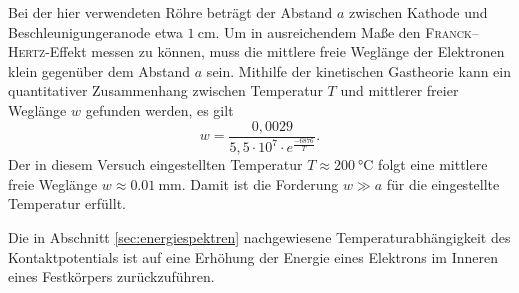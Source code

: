 Bei der hier verwendeten Röhre beträgt der Abstand $a$ zwischen Kathode und Beschleunigungeranode etwa $\SI{1}{\centi\meter}$\cite{skript}.
Um in ausreichendem Maße den \textsc{Franck}--\textsc{Hertz}-Effekt messen zu können, muss die mittlere freie Weglänge der Elektronen klein gegenüber dem Abstand $a$
sein.
Mithilfe der kinetischen Gastheorie kann ein quantitativer Zusammenhang zwischen Temperatur $T$ und mittlerer freier Weglänge $w$ gefunden werden, es gilt
\begin{equation}
	w=\frac{0,0029}{5,5\cdot10^7\cdot e^{\frac{-6876}{T}}}.
\end{equation}
Der in diesem Versuch eingestellten Temperatur $T\approx\SI{200}{\degreeCelsius}$ folgt eine mittlere freie Weglänge $w\approx\SI{0.01}{\milli\meter}$. Damit ist die Forderung $w\gg a$ für die eingestellte Temperatur erfüllt.

Die in Abschnitt \ref{sec:energiespektren} nachgewiesene Temperaturabhängigkeit des Kontaktpotentials ist auf eine Erhöhung der Energie 
eines Elektrons im Inneren eines Festkörpers zurückzuführen.

